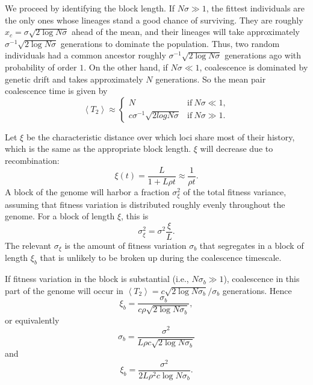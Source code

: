 \documentclass[10pt]{revtex4}
\begin{document}
We proceed by identifying the block length.
If $N\sigma \gg 1$, the fittest individuals are the only ones whose lineages stand a good chance of surviving.
They are roughly $x_c = \sigma \sqrt{2 \log N\sigma}$ ahead of the mean, and their lineages will take approximately $\sigma^{-1} \sqrt{2 \log N\sigma}$ generations to dominate the population.
Thus, two random individuals had a common ancestor roughly $\sigma^{-1} \sqrt{2 \log N\sigma}$ generations ago with probability of order $1$.
On the other hand, if $N\sigma \ll 1$, coalescence is dominated by genetic drift and takes approximately $N$ generations. So the mean pair coalescence time is given by
\begin{equation}
\left< T_2 \right> \approx
\begin{cases}
N & \mathrm{if~} N\sigma \ll 1, \\
c\sigma^{-1}\sqrt{2 log N\sigma} & \mathrm{if~} N\sigma \gg 1.
\end{cases}
\end{equation}

Let $\xi$ be the characteristic distance over which loci share most of their history, which is the same as the appropriate block length.
$\xi$ will decrease due to recombination:
\begin{equation}
\xi (t) = \frac{L}{1 + L\rho t} \approx \frac{1}{\rho t}.
\end{equation}
A block of the genome will harbor a fraction $\sigma_\xi^2$ of the total fitness variance, assuming that fitness variation is distributed roughly evenly throughout the genome.
For a block of length $\xi$, this is
\begin{equation}
\sigma^2_\xi = \sigma^2 \frac{\xi}{L}.
\end{equation}
The relevant $\sigma_\xi$ is the amount of fitness variation $\sigma_b$ that segregates in a block of length $\xi_b$ that is unlikely to be broken up during the coalescence timescale.

If fitness variation in the block is substantial (i.e., $N\sigma_b \gg 1$), coalescence in this part of the genome will occur in $\left< T_2 \right> = c \sqrt{2\log N\sigma_b}/\sigma_b$ generations.
Hence
\begin{equation}
\xi_b = \frac{\sigma_b}{c\rho\sqrt{2\log N\sigma_b}},
\end{equation}
or equivalently
\begin{equation}
\sigma_b = \frac{\sigma^2}{L\rho c \sqrt{2 \log N\sigma_b}}
\end{equation}
and
\begin{equation}
\xi_b = \frac{\sigma^2}{2L\rho^2 c \log N\sigma_b}.
\end{equation}
\end{document}
